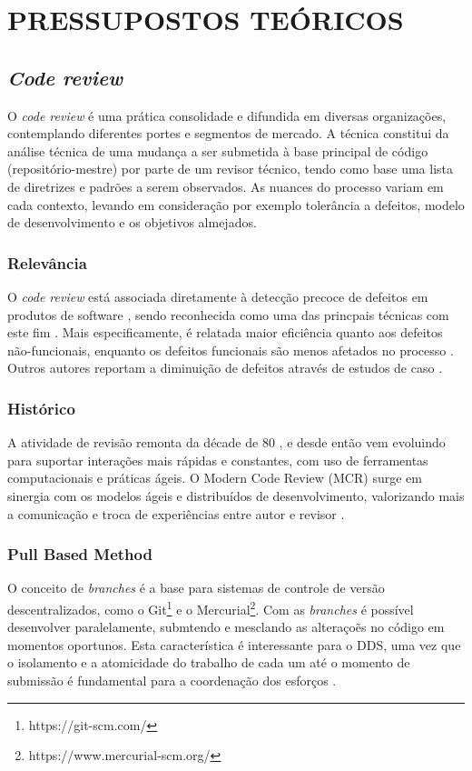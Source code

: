 \documentclass[preprint,12pt]{elsarticle}
\begin{document}
\chapter{PRESSUPOSTOS TEÓRICOS}\label{chap:metodos}

  \section{\textit{Code review}}\label{sec:code_review}
    O \textit{code review} é uma prática consolidade e difundida em diversas organizações, contemplando diferentes portes e segmentos de mercado. A técnica constitui da análise técnica de uma mudança a ser submetida à base principal de código (repositório-mestre) por parte de um revisor técnico, tendo como base uma lista de diretrizes e padrões a serem observados. As nuances do processo variam em cada contexto, levando em consideração por exemplo tolerância a defeitos, modelo de desenvolvimento e os objetivos almejados.

  \subsection{Relevância}\label{sec:relevancia}
    O \textit{code review} está associada diretamente à detecção precoce de defeitos em produtos de software \cite{schettino2014,Kemerer2009}, sendo reconhecida como uma das princpais técnicas com este fim \cite{Boehm2001}. Mais especificamente, é relatada maior eficiência quanto aos defeitos não-funcionais, enquanto os defeitos funcionais são menos afetados no processo \cite{Beller2014202}. Outros autores reportam a diminuição de defeitos através de estudos de caso \cite{McIntosh2014192,Bavota201581,Morales2015171}.

  \subsection{Histórico}\label{sec:historico}
    A atividade de revisão remonta da décade de 80 \cite{Fagan1976}, e desde então vem evoluindo para suportar interações mais rápidas e constantes, com uso de ferramentas computacionais e práticas ágeis. O Modern Code Review (MCR) surge em sinergia com os modelos ágeis e distribuídos de desenvolvimento, valorizando mais a comunicação e troca de experiências entre autor e revisor \cite{Bacchelli2013}.

  \subsection{Pull Based Method}\label{sec:pull_based}
    O conceito de \textit{branches} é a base para sistemas de controle de versão descentralizados, como o  Git\footnote{https://git-scm.com/} e o Mercurial\footnote{https://www.mercurial-scm.org/}. Com as \textit{branches} é possível desenvolver paralelamente, submtendo e mesclando as alteraçoẽs no código em momentos oportunos. Esta característica é interessante para o DDS, uma vez que o isolamento e a atomicidade do trabalho de cada um até o momento de submissão é fundamental para a coordenação dos esforços \cite{barr2012}.
\end{document}
